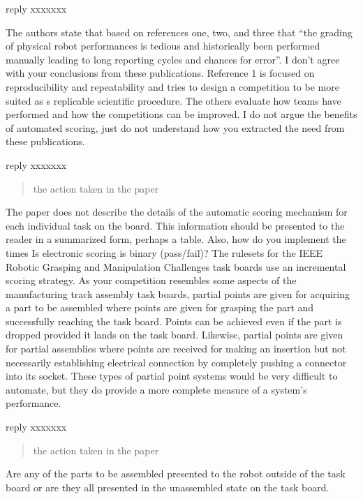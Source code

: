 \documentclass{article}
\begin{document}
\AR reply xxxxxxx

\RC The authors state that based on references one, two, and three that “the grading of physical robot performances is tedious and historically been performed manually leading to long reporting cycles and chances for error”.  I don’t agree with your conclusions from these publications.  Reference 1 is focused on reproducibility and repeatability and tries to design a competition to be more suited as s replicable scientific procedure.  The others evaluate how teams have performed and how the competitions can be improved.   I do not argue the benefits of automated scoring, just do not understand how you extracted the need from these publications.

\AR reply xxxxxxx
\begin{quote}
	the action taken in the paper
\end{quote}

\RC The paper does not describe the details of the automatic scoring mechanism for each individual task on the board.  This information should be presented to the reader in a summarized form, perhaps a table. Also, how do you implement the times Is electronic scoring is binary (pass/fail)? The rulesets for the IEEE Robotic Grasping and Manipulation Challenges task boards use an incremental scoring strategy.  As your competition resembles some aspects of the manufacturing track assembly task boards, partial points are given for acquiring a part to be assembled where points are given for grasping the part and successfully reaching the task board.  Points can be achieved even if the part is dropped provided it lands on the task board.  Likewise, partial points are given for partial assemblies where points are received for making an insertion but not necessarily establishing electrical connection by completely pushing a connector into its socket.  These types of partial point systems would be very difficult to automate, but they do provide a more complete measure of a system’s performance.

\AR reply xxxxxxx
\begin{quote}
	the action taken in the paper
\end{quote}

\RC Are any of the parts to be assembled presented to the robot outside of the task board or are they all presented in the unassembled state on the task board.
\end{document}
